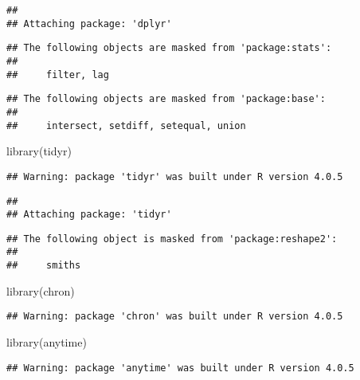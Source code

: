 \documentclass[
]{article}
\newenvironment{Shaded}{\begin{snugshade}}{\end{snugshade}}
\newcommand{\FunctionTok}[1]{\textcolor[rgb]{0.00,0.00,0.00}{#1}}
\newcommand{\NormalTok}[1]{#1}
\begin{document}
\begin{verbatim}
## 
## Attaching package: 'dplyr'
\end{verbatim}

\begin{verbatim}
## The following objects are masked from 'package:stats':
## 
##     filter, lag
\end{verbatim}

\begin{verbatim}
## The following objects are masked from 'package:base':
## 
##     intersect, setdiff, setequal, union
\end{verbatim}

\begin{Shaded}
\begin{Highlighting}[]
\FunctionTok{library}\NormalTok{(tidyr)}
\end{Highlighting}
\end{Shaded}

\begin{verbatim}
## Warning: package 'tidyr' was built under R version 4.0.5
\end{verbatim}

\begin{verbatim}
## 
## Attaching package: 'tidyr'
\end{verbatim}

\begin{verbatim}
## The following object is masked from 'package:reshape2':
## 
##     smiths
\end{verbatim}

\begin{Shaded}
\begin{Highlighting}[]
\FunctionTok{library}\NormalTok{(chron)}
\end{Highlighting}
\end{Shaded}

\begin{verbatim}
## Warning: package 'chron' was built under R version 4.0.5
\end{verbatim}

\begin{Shaded}
\begin{Highlighting}[]
\FunctionTok{library}\NormalTok{(anytime)}
\end{Highlighting}
\end{Shaded}

\begin{verbatim}
## Warning: package 'anytime' was built under R version 4.0.5
\end{verbatim}
\end{document}
